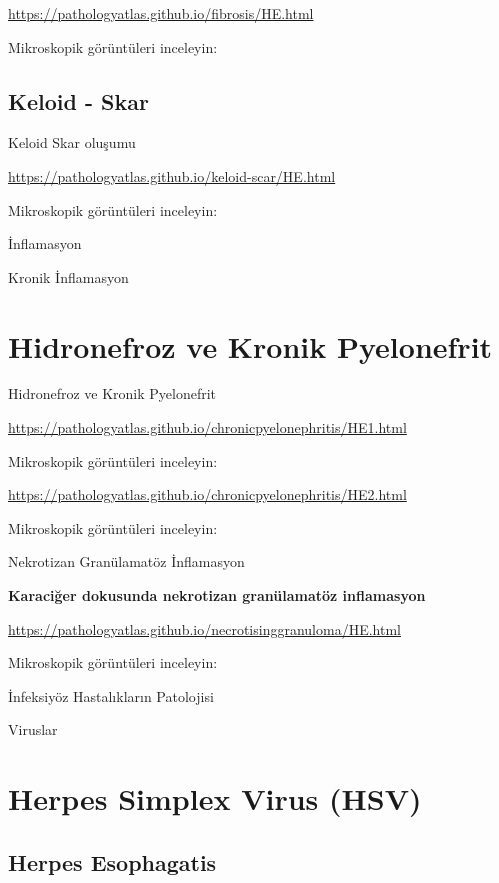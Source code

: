 \documentclass[
  letterpaper,
  DIV=11,
  numbers=noendperiod]{scrreprt}
\begin{document}
\url{https://pathologyatlas.github.io/fibrosis/HE.html}

Mikroskopik görüntüleri inceleyin:

\hypertarget{keloid---skar}{%
\section{Keloid - Skar}\label{keloid---skar}}

Keloid Skar oluşumu

\url{https://pathologyatlas.github.io/keloid-scar/HE.html}

Mikroskopik görüntüleri inceleyin:

İnflamasyon

Kronik İnflamasyon

\hypertarget{hidronefroz-ve-kronik-pyelonefrit}{%
\chapter{Hidronefroz ve Kronik
Pyelonefrit}\label{hidronefroz-ve-kronik-pyelonefrit}}

Hidronefroz ve Kronik Pyelonefrit

\url{https://pathologyatlas.github.io/chronicpyelonephritis/HE1.html}

Mikroskopik görüntüleri inceleyin:

\url{https://pathologyatlas.github.io/chronicpyelonephritis/HE2.html}

Mikroskopik görüntüleri inceleyin:

Nekrotizan Granülamatöz İnflamasyon

\textbf{Karaciğer dokusunda nekrotizan granülamatöz inflamasyon}

\url{https://pathologyatlas.github.io/necrotisinggranuloma/HE.html}

Mikroskopik görüntüleri inceleyin:

İnfeksiyöz Hastalıkların Patolojisi

Viruslar

\hypertarget{herpes-simplex-virus-hsv}{%
\chapter{Herpes Simplex Virus (HSV)}\label{herpes-simplex-virus-hsv}}

\hypertarget{herpes-esophagatis}{%
\section{Herpes Esophagatis}\label{herpes-esophagatis}}
\end{document}
